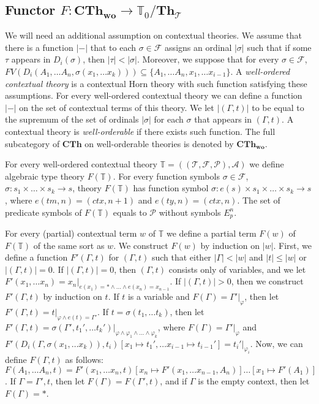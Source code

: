 \documentclass[reqno]{amsart}
\theoremstyle{definition}
\theoremstyle{remark}
\newcommand{\cat}[1]{\mathbf{#1}}
\newcommand{\Th}{\cat{Th}}
\newcommand{\CTh}{\cat{CTh}}
\newcommand{\woCTh}{\cat{CTh_{wo}}}
\newcommand{\ThT}{\Th_{\mathcal{T}}}
\numberwithin{figure}{section}
\begin{document}
\subsection{Functor $F : \woCTh \to \mathbb{T}_0/\ThT$}

We will need an additional assumption on contextual theories.
We assume that there is a function $|-|$ that to each $\sigma \in \mathcal{F}$ assigns an ordinal $|\sigma|$ such that if some $\tau$ appears in $D_i(\sigma)$, then $|\tau| < |\sigma|$.
Moreover, we suppose that for every $\sigma \in \mathcal{F}$, $FV(D_i(A_1, \ldots A_n, \sigma(x_1, \ldots x_k))) \subseteq \{ A_1, \ldots A_n, x_1, \ldots x_{i-1} \}$.
A \emph{well-ordered contextual theory} is a contextual Horn theory with such function satisfying these assumptions.
For every well-ordered contextual theory we can define a function $|-|$ on the set of contextual terms of this theory.
We let $|(\Gamma,t)|$ to be equal to the supremum of the set of ordinals $|\sigma|$ for each $\sigma$ that appears in $(\Gamma,t)$.
A contextual theory is \emph{well-orderable} if there exists such function.
The full subcategory of $\CTh$ on well-orderable theories is denoted by $\woCTh$.

For every well-ordered contextual theory $\mathbb{T} = ((\mathcal{T},\mathcal{F},\mathcal{P}),\mathcal{A})$ we define algebraic type theory $F(\mathbb{T})$.
For every function symbols $\sigma \in \mathcal{F}$, $\sigma : s_1 \times \ldots \times s_k \to s$,
    theory $F(\mathbb{T})$ has function symbol $\sigma : e(s) \times s_1 \times \ldots \times s_k \to s$,
    where $e(tm,n) = (ctx,n+1)$ and $e(ty,n) = (ctx,n)$.
The set of predicate symbols of $F(\mathbb{T})$ equals to $\mathcal{P}$ without symbols $E^n_p$.

For every (partial) contextual term $w$ of $\mathbb{T}$ we define a partial term $F(w)$ of $F(\mathbb{T})$ of the same sort as $w$.
We construct $F(w)$ by induction on $|w|$.
First, we define a function $F'(\Gamma,t)$ for $(\Gamma,t)$ such that either $|\Gamma| < |w|$ and $|t| \leq |w|$ or $|(\Gamma,t)| = 0$.
If $|(\Gamma,t)| = 0$, then $(\Gamma,t)$ consists only of variables, and we let $F'(x_1, \ldots x_n) = x_n|_{e(x_1) = * \land \ldots \land e(x_n) = x_{n-1}}$.
If $|(\Gamma,t)| > 0$, then we construct $F'(\Gamma,t)$ by induction on $t$.
If $t$ is a variable and $F(\Gamma) = \Gamma'|_\varphi$, then let $F'(\Gamma,t) = t|_{\varphi \land e(t) = \Gamma'}$.
If $t = \sigma(t_1, \ldots t_k)$, then let $F'(\Gamma,t) = \sigma(\Gamma', t_1', \ldots t_k')|_{\varphi \land \varphi_1 \land \ldots \land \varphi_k}$,
    where $F(\Gamma) = \Gamma'|_\varphi$ and $F'(D_i(\Gamma,\sigma(x_1, \ldots x_k)), t_i)[x_1 \mapsto t_1', \ldots x_{i-1} \mapsto t_{i-1}'] = t_i'|_{\varphi_i}$.
Now, we can define $F(\Gamma,t)$ as follows: $F(A_1, \ldots A_n, t) = F'(x_1, \ldots x_n, t)[x_n \mapsto F'(x_1, \ldots x_{n-1}, A_n)] \ldots \allowbreak [x_1 \mapsto F'(A_1)]$.
If $\Gamma = \Gamma',t$, then let $F(\Gamma) = F(\Gamma',t)$, and if $\Gamma$ is the empty context, then let $F(\Gamma) = *$.
\end{document}

